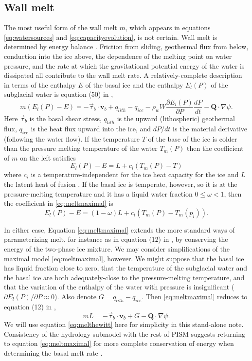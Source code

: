\documentclass[11pt]{amsart}
\newcommand{\bv}{\mathbf{v}}
\begin{document}
\subsection*{Wall melt}  The most useful form of the wall melt $m$, which appears in equations \eqref{eq:watersources} and \eqref{eq:capacityevolution}, is not certain.  Wall melt is determined by energy balance \citep{Hewitt2011}.  Friction from sliding, geothermal flux from below, conduction into the ice above, the dependence of the melting point on water pressure, and the rate at which the gravitational potential energy of the water is dissipated all contribute to the wall melt rate.  A relatively-complete description in terms of the enthalpy $E$ of the basal ice and the enthalpy $E_l(P)$ of the subglacial water is equation (50) in \citet{AschwandenBuelerKhroulevBlatter}, %
\begin{equation}\label{eq:meltmaximal}
m (E_l(P) - E) = -\vec \tau_b\cdot \bv_b + q_{lith} - q_{ice} - \rho_w W \frac{\partial E_l(P)}{\partial P} \frac{dP}{dt} - \mathbf{Q} \cdot \nabla \psi.
\end{equation}
Here $\vec\tau_b$ is the basal shear stress, $q_{lith}$ is the upward (lithospheric) geothermal flux, $q_{ice}$ is the heat flux upward into the ice, and $dP/dt$ is the material derivative (following the water flow).  If the temperature $T$ of the base of the ice is colder than the pressure melting temperature of the water $T_m(P)$ then the coefficient of $m$ on the left satisfies
	$$E_l(P) - E = L + c_i (T_m(P) - T)$$
where $c_i$ is a temperature-independent for the ice heat capacity for the ice and $L$ the latent heat of fusion \citep[equations (4) and (8)]{AschwandenBuelerKhroulevBlatter}.  If the basal ice is temperate, however, so it is at the pressure-melting temperature and it has a liquid water fraction $0\le \omega < 1$, then the coefficient in \eqref{eq:meltmaximal} is
	$$E_l(P) - E = (1-\omega) L + c_i (T_m(P) - T_m(p_i)).$$

In either case, Equation \eqref{eq:meltmaximal} extends the more standard ways of parameterizing melt, for instance as in equation (12) in \citet{Hewitt2011}, by conserving the energy of the two-phase ice mixture.  We may consider simplifications of the maximal model \eqref{eq:meltmaximal}, however.  We might suppose that the basal ice has liquid fraction close to zero, that the temperature of the subglacial water and the basal ice are both adequately-close to the pressure-melting temperature, and that the variation of the enthalpy of the water with pressure is insignificant ($\partial E_l(P)/\partial P \approx 0$).  Also denote $G=q_{lith} - q_{ice}$.  Then \eqref{eq:meltmaximal} reduces to equation (12) in \citet{Hewitt2011},
\begin{equation}\label{eq:melthewitt}
m L = -\vec \tau_b\cdot \bv_b + G - \mathbf{Q} \cdot \nabla \psi.
\end{equation}
We will use equation \eqref{eq:melthewitt} here for simplicity in this stand-alone note.  Consistency of the hydrology submodel with the rest of PISM suggests returning to equation \eqref{eq:meltmaximal} for more complete conservation of energy when determining the basal melt rate \citep{AschwandenBuelerKhroulevBlatter}.
\end{document}
